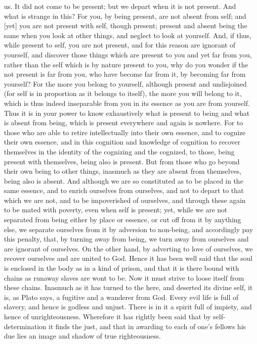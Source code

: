 \documentclass[12pt]{article}
\begin{document}
us. It did not come to be present; but we depart when it is not present. And
what is strange in this? For you, by being present, are not absent from self;
and [yet] you are not present with self, though present; present and absent
being the same when you look at other things, and neglect to look at yourself.
And, if thus, while present to self, you are not present, and for this reason
are ignorant of yourself, and discover those things which are present to you
and yet far from you, rather than the self which is by nature present to you,
why do you wonder if the not present is far from you, who have become far from
it, by becoming far from yourself? For the more you belong to yourself,
although present and undisjoined (for self is in proportion as it belongs to
itself), the more you will belong to it, which is thus indeed inseparable from
you in its essence as you are from yourself. Thus it is in your power to know
exhaustively what is present to being and what is absent from being, which is
present everywhere and again is nowhere. For to those who are able to retire
intellectually into their own essence, and to cognize their own essence, and in
this cognition and knowledge of cognition to recover themselves in the identity
of the cognizing and the cognized, to those, being present with themselves,
being also is present. But from those who go beyond their own being to other
things, inasmuch as they are absent from themselves, being also is absent. And
although we are so constituted as to be placed in the same essence, and to
enrich ourselves from ourselves, and not to depart to that which we are not,
and to be impoverished of ourselves, and through these again to be mated with
poverty, even when self is present; yet, while we are not separated from being
either by place or essence, or cut off from it by anything else, we separate
ourselves from it by adversion to non-being, and accordingly pay this penalty,
that, by turning away from being, we turn away from ourselves and are ignorant
of ourselves. On the other hand, by adverting to love of ourselves, we recover
ourselves and are united to God. Hence it has been well said that the soul is
enclosed in the body as in a kind of prison, and that it is there bound with
chains as runaway slaves are wont to be. Now it must strive to loose itself
from these chains. Inasmuch as it has turned to the here, and deserted its
divine self, it is, as Plato says, a fugitive and a wanderer from God. Every
evil life is full of slavery, and hence is godless and unjust. There is in it a
spirit full of impiety, and hence of unrighteousness. Wherefore it has rightly
been said that by self-determination it finds the just, and that in awarding to
each of one's fellows his due lies an image and shadow of true righteousness.
\end{document}
